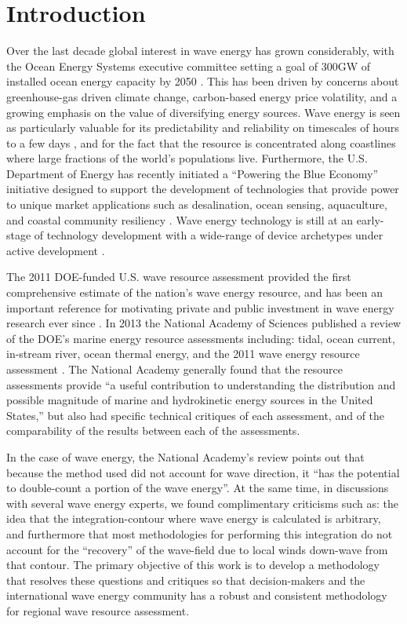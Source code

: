 \section{Introduction}

Over the last decade global interest in wave energy has grown
considerably, with the Ocean Energy Systems executive committee
setting a goal of 300GW of installed ocean energy capacity by 2050
\citep[]{huckerbyInternationalVisionOcean2017}. This has been driven
by concerns about greenhouse-gas driven climate change, carbon-based
energy price volatility, and a growing emphasis on the value of
diversifying energy sources. Wave energy is seen as particularly
valuable for its predictability and reliability on timescales of hours
to a few days \citep{parkinsonIntegratingOceanWave2015}, and for the
fact that the resource is concentrated along coastlines where large
fractions of the world's populations live. Furthermore, the
U.S. Department of Energy has recently initiated a ``Powering the Blue
Economy'' initiative designed to support the development of
technologies that provide power to unique market applications such as
desalination, ocean sensing, aquaculture, and coastal community
resiliency \citep{PBE_REPORT}. Wave energy technology is still at an
early-stage of technology development with a wide-range of device
archetypes under active development
\citep[]{babaritOceanWaveEnergy2017}.

The 2011 DOE-funded U.S. wave resource assessment provided the first
comprehensive estimate of the nation’s wave energy resource, and has
been an important reference for motivating private and public
investment in wave energy research ever since
\citep[]{EPRIwaveresource2011}. In 2013 the National Academy of
Sciences published a review of the DOE’s marine energy resource
assessments including: tidal, ocean current, in-stream river, ocean
thermal energy, and the 2011 wave energy resource assessment
\citep{nationalresearchcouncilEvaluationDepartmentEnergy2013}.  The
National Academy generally found that the resource assessments provide
“a useful contribution to understanding the distribution and possible
magnitude of marine and hydrokinetic energy sources in the United
States,” but also had specific technical critiques of each assessment,
and of the comparability of the results between each of the
assessments.

In the case of wave energy, the National Academy’s review points out that
because the method used did not account for wave direction, it “has the
potential to double-count a portion of the wave energy”. At the same
time, in discussions with several wave energy experts, we found
complimentary criticisms such as: the idea that the
integration-contour where wave energy is calculated is arbitrary, and
furthermore that most methodologies for performing this integration do
not account for the ``recovery'' of the wave-field due to local winds
down-wave from that contour. The primary objective of this work is to
develop a methodology that resolves these questions and critiques so
that decision-makers and the international wave energy community has a
robust and consistent methodology for regional wave resource
assessment.

